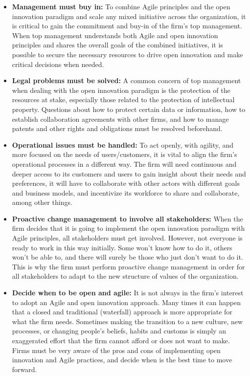 \documentclass[
  letterpaper,
  DIV=11,
  numbers=noendperiod]{scrreprt}
\begin{document}
\begin{itemize}
\item
  \textbf{Management must buy in:} To combine Agile principles and the
  open innovation paradigm and scale any mixed initiative across the
  organization, it is critical to gain the commitment and buy-in of the
  firm's top management. When top management understands both Agile and
  open innovation principles and shares the overall goals of the
  combined initiatives, it is possible to secure the necessary resources
  to drive open innovation and make critical decisions when needed.
\item
  \textbf{Legal problems must be solved:} A common concern of top
  management when dealing with the open innovation paradigm is the
  protection of the resources at stake, especially those related to the
  protection of intellectual property. Questions about how to protect
  certain data or information, how to establish collaboration agreements
  with other firms, and how to manage patents and other rights and
  obligations must be resolved beforehand.
\item
  \textbf{Operational issues must be handled:} To act openly, with
  agility, and more focused on the needs of users/customers, it is vital
  to align the firm's operational processes in a different way. The firm
  will need continuous and deeper access to its customers and users to
  gain insight about their needs and preferences, it will have to
  collaborate with other actors with different goals and business
  models, and incentivize its workforce to share and collaborate, among
  other things.
\item
  \textbf{Proactive change management to involve all stakeholders:} When
  the firm decides that it is going to implement the open innovation
  paradigm with Agile principles, all stakeholders must get involved.
  However, not everyone is ready to work in this way initially. Some
  won't know how to do it, others won't be able to, and there will
  surely be those who just don't want to do it. This is why the firm
  must perform proactive change management in order for all stakeholders
  to adapt to the new structure of values of the organization.
\item
  \textbf{Decide when to be open and agile:} It is not always in the
  firm's interest to adopt an Agile and open innovation approach. Many
  times it can happen that a closed and traditional (waterfall) approach
  is more appropriate for what the firm needs. Sometimes making the
  transition to a new culture, new processes, or changing people's
  beliefs, habits and customs is simply an exaggerated effort that the
  firm cannot afford or does not want to make. Firms must be very aware
  of the pros and cons of implementing open innovation and Agile
  practices, and decide when is the best time to move forward.
\end{itemize}
\end{document}
